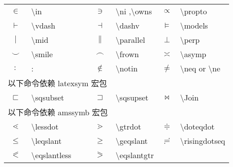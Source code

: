 \documentclass[a4paper]{ctexart}
\begin{document}
\begin{table}[H]
\begin{tabular}{clclcl}
            $\in$           & \textbackslash in         & $\ni$         & \textbackslash ni ,\textbackslash owns    &
            $\propto$       & \textbackslash propto                                                                 \\
            $\vdash$        & \textbackslash vdash      & $\dashv$      & \textbackslash dashv                      &
            $\models$       & \textbackslash models                                                                 \\
            $\mid$          & \textbackslash mid        & $\parallel$   & \textbackslash parallel                   &
            $\perp$         & \textbackslash perp                                                                   \\
            $\smile$        & \textbackslash smile      & $\frown$      & \textbackslash frown                      &
            $\asymp$        & \textbackslash asymp                                                                  \\
            $:$             & :                         & $\notin$      & \textbackslash notin                      &
            $\neq$          & \textbackslash neq or \textbackslash ne                                               \\
            \midrule
            \multicolumn{3}{l}{以下命令依赖 latexsym 宏包}\\
            $\sqsubset$     & \textbackslash sqsubset   & $\sqsupset$   & \textbackslash sqsupset                   & 
            $\Join$         & \textbackslash Join                                                                   \\
            \midrule 
            \multicolumn{3}{l}{以下命令依赖 amssymb 宏包}\\
            $\lessdot$              & \textbackslash lessdot            & $\gtrdot$         & \textbackslash gtrdot         & 
            $\doteqdot$             & \textbackslash doteqdot                                                               \\
            $\leqslant$             & \textbackslash leqslant           & $\geqslant$       & \textbackslash geqslant       &
            $\risingdotseq$         & \textbackslash risingdotseq                                                           \\
            $\eqslantless$          & \textbackslash eqslantless        & $\eqslantgtr$     & \textbackslash eqslantgtr     &

\end{tabular}
\end{table}
\end{document}

